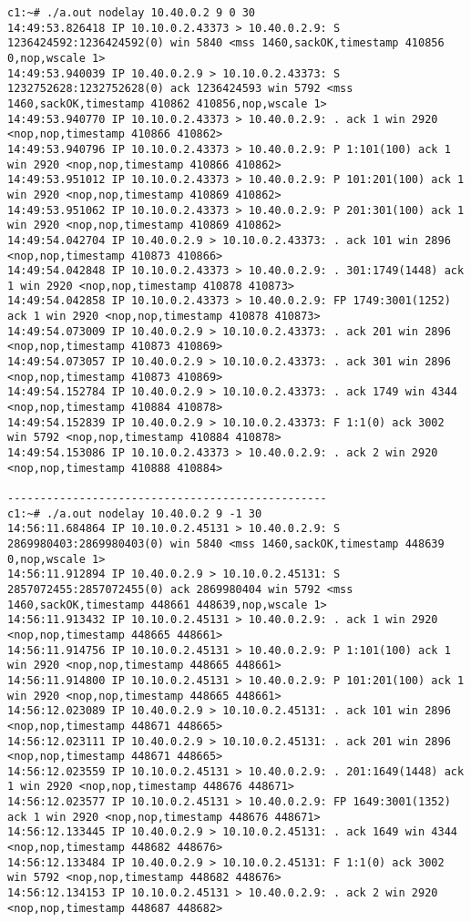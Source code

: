 \documentclass[a4paper,12pt]{article}
\begin{document}
\begin{lstlisting}
c1:~# ./a.out nodelay 10.40.0.2 9 0 30
14:49:53.826418 IP 10.10.0.2.43373 > 10.40.0.2.9: S 1236424592:1236424592(0) win 5840 <mss 1460,sackOK,timestamp 410856 0,nop,wscale 1>
14:49:53.940039 IP 10.40.0.2.9 > 10.10.0.2.43373: S 1232752628:1232752628(0) ack 1236424593 win 5792 <mss 1460,sackOK,timestamp 410862 410856,nop,wscale 1>
14:49:53.940770 IP 10.10.0.2.43373 > 10.40.0.2.9: . ack 1 win 2920 <nop,nop,timestamp 410866 410862>
14:49:53.940796 IP 10.10.0.2.43373 > 10.40.0.2.9: P 1:101(100) ack 1 win 2920 <nop,nop,timestamp 410866 410862>
14:49:53.951012 IP 10.10.0.2.43373 > 10.40.0.2.9: P 101:201(100) ack 1 win 2920 <nop,nop,timestamp 410869 410862>
14:49:53.951062 IP 10.10.0.2.43373 > 10.40.0.2.9: P 201:301(100) ack 1 win 2920 <nop,nop,timestamp 410869 410862>
14:49:54.042704 IP 10.40.0.2.9 > 10.10.0.2.43373: . ack 101 win 2896 <nop,nop,timestamp 410873 410866>
14:49:54.042848 IP 10.10.0.2.43373 > 10.40.0.2.9: . 301:1749(1448) ack 1 win 2920 <nop,nop,timestamp 410878 410873>
14:49:54.042858 IP 10.10.0.2.43373 > 10.40.0.2.9: FP 1749:3001(1252) ack 1 win 2920 <nop,nop,timestamp 410878 410873>
14:49:54.073009 IP 10.40.0.2.9 > 10.10.0.2.43373: . ack 201 win 2896 <nop,nop,timestamp 410873 410869>
14:49:54.073057 IP 10.40.0.2.9 > 10.10.0.2.43373: . ack 301 win 2896 <nop,nop,timestamp 410873 410869>
14:49:54.152784 IP 10.40.0.2.9 > 10.10.0.2.43373: . ack 1749 win 4344 <nop,nop,timestamp 410884 410878>
14:49:54.152839 IP 10.40.0.2.9 > 10.10.0.2.43373: F 1:1(0) ack 3002 win 5792 <nop,nop,timestamp 410884 410878>
14:49:54.153086 IP 10.10.0.2.43373 > 10.40.0.2.9: . ack 2 win 2920 <nop,nop,timestamp 410888 410884>

-------------------------------------------------
c1:~# ./a.out nodelay 10.40.0.2 9 -1 30
14:56:11.684864 IP 10.10.0.2.45131 > 10.40.0.2.9: S 2869980403:2869980403(0) win 5840 <mss 1460,sackOK,timestamp 448639 0,nop,wscale 1>
14:56:11.912894 IP 10.40.0.2.9 > 10.10.0.2.45131: S 2857072455:2857072455(0) ack 2869980404 win 5792 <mss 1460,sackOK,timestamp 448661 448639,nop,wscale 1>
14:56:11.913432 IP 10.10.0.2.45131 > 10.40.0.2.9: . ack 1 win 2920 <nop,nop,timestamp 448665 448661>
14:56:11.914756 IP 10.10.0.2.45131 > 10.40.0.2.9: P 1:101(100) ack 1 win 2920 <nop,nop,timestamp 448665 448661>
14:56:11.914800 IP 10.10.0.2.45131 > 10.40.0.2.9: P 101:201(100) ack 1 win 2920 <nop,nop,timestamp 448665 448661>
14:56:12.023089 IP 10.40.0.2.9 > 10.10.0.2.45131: . ack 101 win 2896 <nop,nop,timestamp 448671 448665>
14:56:12.023111 IP 10.40.0.2.9 > 10.10.0.2.45131: . ack 201 win 2896 <nop,nop,timestamp 448671 448665>  
14:56:12.023559 IP 10.10.0.2.45131 > 10.40.0.2.9: . 201:1649(1448) ack 1 win 2920 <nop,nop,timestamp 448676 448671>
14:56:12.023577 IP 10.10.0.2.45131 > 10.40.0.2.9: FP 1649:3001(1352) ack 1 win 2920 <nop,nop,timestamp 448676 448671>
14:56:12.133445 IP 10.40.0.2.9 > 10.10.0.2.45131: . ack 1649 win 4344 <nop,nop,timestamp 448682 448676>
14:56:12.133484 IP 10.40.0.2.9 > 10.10.0.2.45131: F 1:1(0) ack 3002 win 5792 <nop,nop,timestamp 448682 448676>
14:56:12.134153 IP 10.10.0.2.45131 > 10.40.0.2.9: . ack 2 win 2920 <nop,nop,timestamp 448687 448682>


\end{lstlisting}
\end{document}
